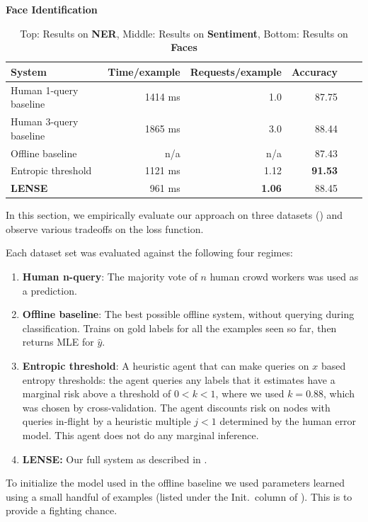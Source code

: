 \begin{table}[ht]
{\bf Face Identification}\\
\begin{tabular}{l  r  r  r  r  r}
    \textbf{System} & \textbf{Time/example} & \textbf{Requests/example} & \textbf{Accuracy} \\ \hline
    Human 1-query baseline & 1414 ms & 1.0 & 87.75 \\ %
    Human 3-query baseline & 1865 ms & 3.0 & 88.44 \\ %
    Offline baseline & n/a & n/a & 87.43 \\    %
    Entropic threshold & 1121 ms & 1.12 & \textbf{91.53} \\ %
    \textbf{LENSE} & 961 ms & \textbf{1.06} & 88.45 \\   %
\end{tabular}
  \caption{Top: Results on {\bf NER}, Middle: Results on {\bf Sentiment}, Bottom: Results on {\bf Faces}}
\end{table}

In this section, we empirically evaluate our approach on three datasets () and observe various tradeoffs on the loss function.

Each dataset set was evaluated against the following four regimes:
\begin{enumerate}
  \item {\bf Human n-query}: The majority vote of $n$ human crowd workers was used as a prediction.
  \item {\bf Offline baseline}: The best possible offline system, without querying during classification. Trains on gold labels for all the examples seen so far, then returns MLE for $\hat{y}$.
  \item {\bf Entropic threshold}: A heuristic agent that can make queries on $x$ based entropy thresholds: the agent queries any labels that it estimates have a marginal risk above a threshold of $0 < k < 1$, where we used $k = 0.88$, which was chosen by cross-validation. The agent discounts risk on nodes with queries in-flight by a heuristic multiple $j < 1$ determined by the human error model. This agent does not do any marginal inference.
  \item {\bf LENSE:} Our full system as described in .
\end{enumerate}

To initialize the model used in the offline baseline we used parameters learned using a small handful of examples (listed under the Init.\ column of ). This is to provide a fighting chance.

